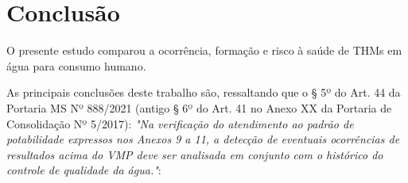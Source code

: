 \chapter{Conclusão}

O presente estudo comparou a ocorrência, formação e risco à saúde de THMs em água para consumo humano.

As principais conclusões deste trabalho são, ressaltando que o § 5º do Art. 44 da Portaria MS Nº 888/2021 (antigo § 6º do Art. 41 no Anexo XX da Portaria de Consolidação Nº 5/2017): \textit{"Na verificação do atendimento ao padrão de potabilidade expressos nos Anexos 9 a 11, a detecção de eventuais ocorrências de resultados acima do VMP deve ser analisada em conjunto com o histórico do controle de qualidade da água."}:

